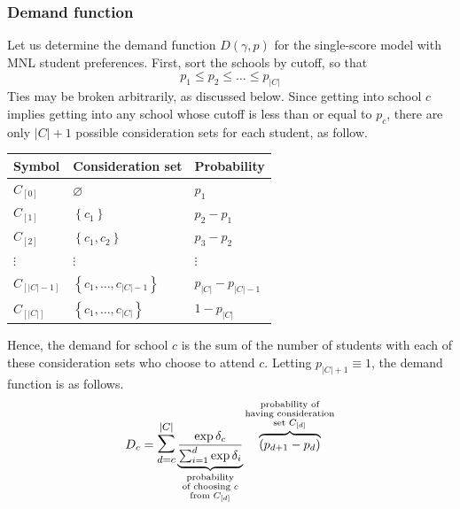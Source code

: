 \documentclass[12pt]{article}
\numberwithin{equation}{subsection}
\theoremstyle{definition}
\begin{document}
\subsubsection{Demand function}
Let us determine the demand function $D(\gamma, p)$ for the single-score model with MNL student preferences. First, sort the schools by cutoff, so that
\[p_1 \leq p_2 \leq \dots \leq p_{|C|}\]
Ties may be broken arbitrarily, as discussed below. Since getting into school $c$ implies getting into any school whose cutoff is less than or equal to $p_c$, there are only $|C| + 1$ possible consideration sets for each student, as follow.
\begin{center}
\begin{tabular}{lll}
\textbf{Symbol} & \textbf{Consideration set} & \textbf{Probability} \\ \hline
$C_{[0]}$    & $\varnothing$    & $p_1$                  \\
$C_{[1]}$    & $\left\{ c_1 \right\}$    & $p_2 - p_1$               \\
$C_{[2]}$    & $\left\{ c_1, c_2 \right\}$    & $p_3 - p_2$               \\
$\vdots$ & $\vdots$ & $\vdots$ \\
$C_{[|C| - 1]}$           & $\left\{ c_1, \dots, c_{|C| - 1} \right\}$     & $p_{|C|} - p_{|C|-1}$             \\
$C_{[|C|]}$           & $\left\{ c_1, \dots, c_{|C|} \right\}$     & $1 - p_{|C|}$                 
\end{tabular}
\end{center}
Hence, the demand for school $c$ is the sum of the number of students with each of these consideration sets who choose to attend $c$. Letting $p_{|C|+1} \equiv 1$, the demand function is as follows.
\begin{equation}D_c = \mathlarger{\mathlarger{\sum}}_{d=c}^{|C|} 
\underbrace{\frac{\exp{\delta_c}}{ \sum_{i=1}^d \exp{\delta_i}}}_{\substack{\text{probability} \\ \text{of choosing } c \\ \text{from }C_{[d]}}} 
\overbrace{\left(p_{d+1} - p_{d}\right)}^{\substack{\text{probability of}\\ \text{having consideration} \\ \text{set }C_{[d]}}} 
\label{mnlonetestdemand}\end{equation}
\end{document}
